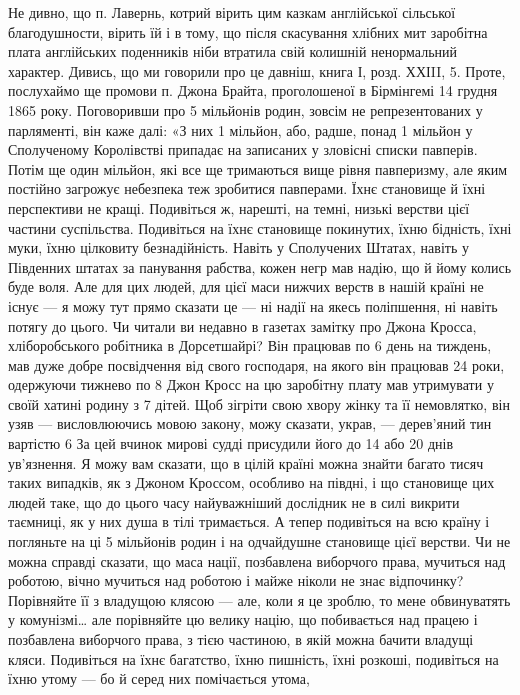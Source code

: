 Не дивно, що п. Лавернь, котрий вірить цим казкам англійської сільської
благодушности, вірить їй і в тому, що після скасування хлібних мит заробітна плата
англійських поденників ніби втратила свій колишній ненормальний характер.
Дивись, що ми говорили про це давніш, книга І, розд. ХХІII, 5. Проте, послухаймо
ще промови п. Джона Брайта, проголошеної в Бірмінгемі 14 грудня 1865 року.
Поговоривши про 5 мільйонів родин, зовсім не репрезентованих у парляменті,
він каже далі: «З них 1 мільйон, або, радше, понад 1 мільйон у Сполученому
Королівстві припадає на записаних у зловісні списки павперів. Потім ще один
мільйон, які все ще тримаються вище рівня павперизму, але яким постійно
загрожує небезпека теж зробитися павперами. Їхнє становище й їхні перспективи
не кращі. Подивіться ж, нарешті, на темні, низькі верстви цієї частини суспільства.
Подивіться на їхнє становище покинутих, їхню бідність, їхні муки, їхню цілковиту
безнадійність. Навіть у Сполучених Штатах, навіть у Південних штатах за
панування рабства, кожен негр мав надію, що й йому колись буде воля.
Але для цих людей, для цієї маси нижчих верств в нашій країні не існує —
я можу тут прямо сказати це — ні надії на якесь поліпшення, ні навіть
потягу до цього. Чи читали ви недавно в газетах замітку про Джона Кросса,
хліборобського робітника в Дорсетшайрі? Він працював по 6 день на тиждень,
мав дуже добре посвідчення від свого господаря, на якого він працював 24 роки,
одержуючи тижнево по 8 Джон Кросс на цю заробітну плату мав
утримувати у своїй хатині родину з 7 дітей. Щоб зігріти свою хвору жінку та
її немовлятко, він узяв — висловлюючись мовою закону, можу сказати, украв, —
дерев’яний тин вартістю 6 За цей вчинок мирові судді присудили його
до 14 або 20 днів ув’язнення. Я можу вам сказати, що в цілій країні можна
знайти багато тисяч таких випадків, як з Джоном Кроссом, особливо на півдні,
і що становище цих людей таке, що до цього часу найуважніший дослідник не
в силі викрити таємниці, як у них душа в тілі тримається. А тепер подивіться
на всю країну і погляньте на ці 5 мільйонів родин і на одчайдушне становище
цієї верстви. Чи не можна справді сказати, що маса нації, позбавлена
виборчого права, мучиться над роботою, вічно мучиться над роботою і майже
ніколи не знає відпочинку? Порівняйте її з владущою клясою — але, коли я це
зроблю, то мене обвинуватять у комунізмі\dots{} але порівняйте цю велику націю,
що побивається над працею і позбавлена виборчого права, з тією частиною,
в якій можна бачити владущі кляси. Подивіться на їхнє багатство, їхню пишність,
їхні розкоші, подивіться на їхню утому — бо й серед них помічається утома,
\parbreak{}  %
